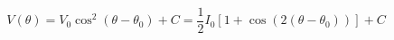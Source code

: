 \begin{equation}
\label{eq:Photodiode_Voltage}
V(\theta) = V_0 \cos^2(\theta - {\theta}_0)+ C = \frac{1}{2}I_0\left[1 + \cos(2 (\theta - \theta_0))\right]+ C
\end{equation}
